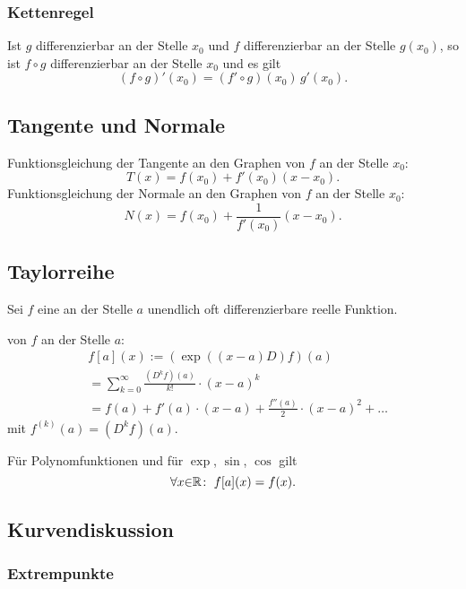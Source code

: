 \subsubsection{Kettenregel}
Ist $g$ differenzierbar an der Stelle $x_0$ und
$f$ differenzierbar an der Stelle $g(x_0)$, so ist $f\circ g$
differenzierbar an der Stelle $x_0$ und es gilt
\begin{equation}
(f\circ g)'(x_0) = (f'\circ g)(x_0)\, g'(x_0).
\end{equation}
\subsection{Tangente und Normale}
Funktionsgleichung der Tangente an den Graphen von
$f$ an der Stelle $x_0$:
\begin{equation}
T(x) = f(x_0)+f'(x_0)(x-x_0).
\end{equation}
Funktionsgleichung der Normale an den Graphen von $f$
an der Stelle $x_0$:
\begin{equation}
N(x) = f(x_0)+\frac{1}{f'(x_0)}(x-x_0).
\end{equation}

\subsection{Taylorreihe}
Sei $f$ eine an der Stelle $a$ unendlich oft differenzierbare
reelle Funktion.

{}
 von $f$ an der Stelle $a$:
\begin{equation}
\begin{split}
&f[a](x) :=  (\exp((x-a)D)f)(a)\\
&= \sum_{k=0}^\infty\frac{(D^k f)(a)}{k!}\cdot (x-a)^k\\
&=f(a)+f'(a)\cdot (x-a)+\frac{f''(a)}{2}\cdot (x-a)^2+\ldots
\end{split}
\end{equation}
mit $f^{(k)}(a)=(D^k f)(a)$.

Für Polynomfunktionen und für $\exp$, $\sin$, $\cos$ gilt
\begin{equation}
\forall x{\in}\mathbb R\colon\; f[a](x)=f(x).
\end{equation}

\subsection{Kurvendiskussion}
\subsubsection{Extrempunkte}

